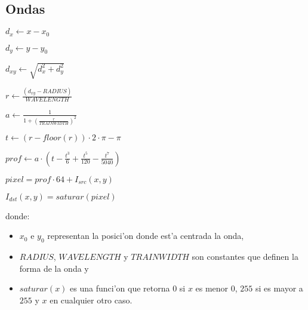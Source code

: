 \subsection{Ondas}


\begin{algorithm}[H]
  \begin{algorithmic}[1]
      \STATE $d_x \gets x - x_0$

      \STATE

      \STATE $d_y \gets y - y_0$

      \STATE

      \STATE $d_{xy} \gets \sqrt{d_{x}^2+d_{y}^2}$

      \STATE

      \STATE $r \gets \frac{(d_{xy} - RADIUS)}{WAVELENGTH}$

      \STATE

      \STATE $a \gets \frac{1}{1 + (\frac{r}{TRAINWIDTH})^2 }$

      \STATE

      \STATE $t \gets ( r-floor(r) ) \cdot 2 \cdot \pi - \pi$

      \STATE

      \STATE $prof \gets a \cdot (t - \frac{t^3}{6}+\frac{t^5}{120}-\frac{t^7}{5040})$

      \STATE

      \STATE $pixel = prof \cdot 64 + I_{src}(x, y)$    

      \STATE

      \STATE $I_{dst}(x, y) = saturar(pixel)$
    \ENDFOR
  \end{algorithmic}
  \caption{$ondas (I_{src}, I_{dst}, x_0, y_0)$}
  \label{alg:ondas}
\end{algorithm}

donde:

\begin{itemize}
  \item $x_0$ e $y_0$ representan la posici'on donde est'a centrada la onda,
  \item $RADIUS$, $WAVELENGTH$ y $TRAINWIDTH$ son constantes que definen la 
  forma de la onda y
  \item $saturar(x)$ es una funci'on que retorna $0$ si $x$ es menor $0$, $255$
  si es mayor a $255$ y $x$ en cualquier otro caso.
\end{itemize}









